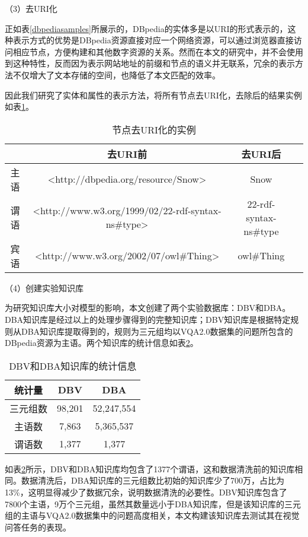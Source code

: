 （3）去URI化

正如表\ref{dbpediasamples}所展示的，DBpedia的实体多是以URI的形式表示的，这种表示方式的优势是DBpedia资源直接对应一个网络资源，可以通过浏览器直接访问相应节点，方便构建和其他数字资源的关系。然而在本文的研究中，并不会使用到这种特性，反而因为表示网站地址的前缀和节点的语义并无联系，冗余的表示方法不仅增大了文本存储的空间，也降低了本文匹配的效率。

因此我们研究了实体和属性的表示方法，将所有节点去URI化，去除后的结果实例如表\ref{deuri}。
\begin{table}[H]
\centering
\caption{节点去URI化的实例}
\begin{adjustbox}{max width=0.8\textwidth}
\begin{tabular}{cccc}
\toprule
 & 去URI前 & 去URI后\\
\midrule
主语 &  <http://dbpedia.org/resource/Snow> &  Snow \\
谓语 & <http://www.w3.org/1999/02/22-rdf-syntax-ns\#type>  & 22-rdf-syntax-ns\#type \\
宾语 & <http://www.w3.org/2002/07/owl\#Thing> & owl\#Thing\\
\bottomrule
\end{tabular}
\end{adjustbox}
\label{deuri}
\end{table}

（4）创建实验知识库

为研究知识库大小对模型的影响，本文创建了两个实验数据库：DBV和DBA。DBA知识库是经过以上的处理步骤得到的完整知识库；DBV知识库是根据特定规则从DBA知识库提取得到的，规则为三元组均以VQA2.0数据集的问题所包含的DBpedia资源为主语。两个知识库的统计信息如表\ref{DBV-DBA}。
\begin{table}[H]
\centering
\caption{DBV和DBA知识库的统计信息}
\begin{tabular}{ccc}
\toprule
统计量 & DBV & DBA \\
\midrule
三元组数 & 98,201 & 52,247,554 \\
主语数 &  7,863 &  5,365,537 \\
谓语数 & 1,377 & 1,377 \\
\bottomrule
\end{tabular}
\label{DBV-DBA}
\end{table}

如表\ref{DBV-DBA}所示，DBV和DBA知识库均包含了1377个谓语，这和数据清洗前的知识库相同。数据清洗后，DBA知识库的三元组数比初始的知识库少了700万，占比为13\%，这明显得减少了数据冗余，说明数据清洗的必要性。DBV知识库包含了7800个主语，9万个三元组，虽然其数量远小于DBA知识库，但是该知识库的三元组的主语与VQA2.0数据集中的问题高度相关，本文构建该知识库去测试其在视觉问答任务的表现。

